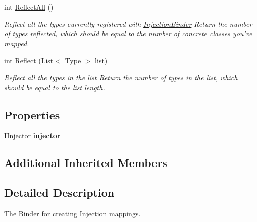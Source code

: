 \begin{DoxyCompactItemize}
\item 
int \hyperlink{classstrange_1_1extensions_1_1injector_1_1impl_1_1_injection_binder_a5a03e345237a56af33953e215852526b}{Reflect\-All} ()
\begin{DoxyCompactList}\small\item\em Reflect all the types currently registered with \hyperlink{classstrange_1_1extensions_1_1injector_1_1impl_1_1_injection_binder}{Injection\-Binder} Return the number of types reflected, which should be equal to the number of concrete classes you've mapped. \end{DoxyCompactList}\item 
\hypertarget{classstrange_1_1extensions_1_1injector_1_1impl_1_1_injection_binder_ac808f26ca7f074695abddb3d517ae49f}{int \hyperlink{classstrange_1_1extensions_1_1injector_1_1impl_1_1_injection_binder_ac808f26ca7f074695abddb3d517ae49f}{Reflect} (List$<$ Type $>$ list)}\label{classstrange_1_1extensions_1_1injector_1_1impl_1_1_injection_binder_ac808f26ca7f074695abddb3d517ae49f}

\begin{DoxyCompactList}\small\item\em Reflect all the types in the list Return the number of types in the list, which should be equal to the list length. \end{DoxyCompactList}\end{DoxyCompactItemize}
\subsection*{Properties}
\begin{DoxyCompactItemize}
\item 
\hypertarget{classstrange_1_1extensions_1_1injector_1_1impl_1_1_injection_binder_a11b411b16f993faf251136793dd294be}{\hyperlink{interfacestrange_1_1extensions_1_1injector_1_1api_1_1_i_injector}{I\-Injector} {\bfseries injector}}\label{classstrange_1_1extensions_1_1injector_1_1impl_1_1_injection_binder_a11b411b16f993faf251136793dd294be}

\end{DoxyCompactItemize}
\subsection*{Additional Inherited Members}


\subsection{Detailed Description}
The Binder for creating Injection mappings. 

